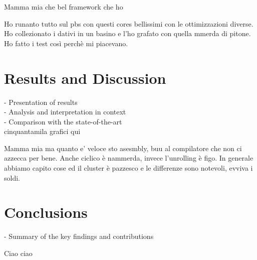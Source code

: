 \documentclass[conference]{IEEEtran}
\begin{document}
Mamma mia che bel framework che ho

Ho runanto tutto sul pbs con questi cores bellissimi con le ottimizzazioni diverse. Ho collezionato i dativi in un basino e l'ho grafato con quella mmerda di pitone. Ho fatto i test così perchè mi piacevano.

\section{Results and Discussion}

- Presentation of results \\
- Analysis and interpretation in context \\
- Comparison with the state-of-the-art \\

cinquantamila grafici qui

Mamma mia ma quanto e' veloce sto asesmbly,
buu al compilatore che non ci azzecca per bene. 
Anche ciclico è nammerda, invece l'unrolling
è figo.
In generale abbiamo capito
cose ed il cluster è pazzesco e le differenze
sono notevoli, evviva i soldi.


\section{Conclusions}

- Summary of the key findings and contributions

Ciao ciao
\end{document}
